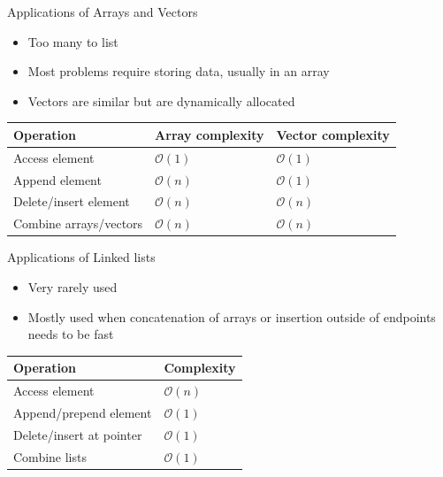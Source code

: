 \documentclass{beamer}
\begin{document}
\begin{frame}[plain]{Applications of Arrays and Vectors}
    \begin{itemize}
        \item Too many to list
        \item Most problems require storing data, usually in an array
        \item Vectors are similar but are dynamically allocated
    \end{itemize}
    \vspace*{1cm}
    \begin{center}
    \begin{tabular}{l|l|l}
    Operation & Array complexity & Vector complexity \\ \hline
    Access element & $\mathcal{O}(1)$ & $\mathcal{O}(1)$ \\
    Append element & $\mathcal{O}(n)$ & $\mathcal{O}(1)$ \\
    Delete/insert element & $\mathcal{O}(n)$ & $\mathcal{O}(n)$ \\
    Combine arrays/vectors & $\mathcal{O}(n)$ & $\mathcal{O}(n)$ \\
    \end{tabular}
    \end{center}
\end{frame}

\begin{frame}[plain]{Applications of Linked lists}
    \begin{itemize}
        \item Very rarely used
        \item Mostly used when concatenation of arrays or insertion outside of endpoints needs to be fast
    \end{itemize}
    \vspace*{1cm}
    \begin{center}
    \begin{tabular}{l|l}
    Operation & Complexity \\ \hline
    Access element & $\mathcal{O}(n)$ \\
    Append/prepend element & $\mathcal{O}(1)$ \\
    Delete/insert at pointer & $\mathcal{O}(1)$ \\
    Combine lists & $\mathcal{O}(1)$ \\
    \end{tabular}
    \end{center}
\end{frame}
\end{document}
